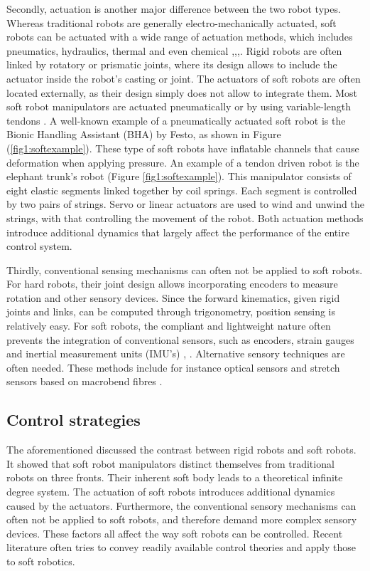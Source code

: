 Secondly, actuation is another major difference between the two robot types. Whereas traditional robots are generally electro-mechanically actuated, soft robots can be actuated with a wide range of actuation methods, which includes pneumatics, hydraulics, thermal and even chemical \cite{BHA},\cite{marchese2014},\cite{kang2019programmable},\cite{shepherd2013using}. Rigid robots are often linked by rotatory or prismatic joints, where its design allows to include the actuator inside the robot's casting or joint. The actuators of soft robots are often located externally, as their design simply does not allow to integrate them. Most soft robot manipulators are actuated pneumatically or by using variable-length tendons \cite{Rus2015}. A well-known example of a pneumatically actuated soft robot is the Bionic Handling Assistant (BHA) by Festo, as shown in Figure (\ref{fig1:softexample}). These type of soft robots have inflatable channels that cause deformation when applying pressure. An example of a tendon driven robot is the elephant trunk's robot \cite{cieslak1999elephant} (Figure \ref{fig1:softexample}). This manipulator consists of eight elastic segments linked together by coil springs. Each segment is controlled by two pairs of strings. Servo or linear actuators are used to wind and unwind the strings, with that controlling the movement of the robot. Both actuation methods introduce additional dynamics that largely affect the performance of the entire control system. 

Thirdly, conventional sensing mechanisms can often not be applied to soft robots. For hard robots, their joint design allows incorporating encoders to measure rotation and other sensory devices. Since the forward kinematics, given rigid joints and links, can be computed through trigonometry, position sensing is relatively easy. For soft robots, the compliant and lightweight nature often prevents the integration of conventional sensors, such as encoders, strain gauges and inertial measurement units (IMU's) \cite{Rus2015}, \cite{Lee2017}. Alternative sensory techniques are often needed. These methods include for instance optical sensors and stretch sensors based on macrobend fibres \cite{Sareh2015}.

\subsection*{Control strategies}
The aforementioned discussed the contrast between rigid robots and soft robots. It showed that soft robot manipulators distinct themselves from traditional robots on three fronts. Their inherent soft body leads to a theoretical infinite degree system. The actuation of soft robots introduces additional dynamics caused by the actuators. Furthermore, the conventional sensory mechanisms can often not be applied to soft robots, and therefore demand more complex sensory devices. These factors all affect the way soft robots can be controlled. Recent literature often tries to convey readily available control theories and apply those to soft robotics.

